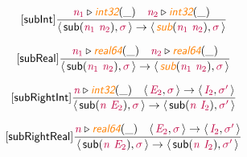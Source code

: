 \documentclass[10pt,leqno,fleqn]{article}
\newcommand{\artVariable}[1]{\mbox{\color{purple}\em #1\/}}
\newcommand{\artConstructor}[1]{\mbox{\sf #1}}
\newcommand{\artSpecial}[1]{\mbox{\color{orange}\sf\em #1}}
\begin{document}
\begin{equation}
\tag*{[\artConstructor{\sf subInt}]}
\begin{split}\frac{ \artVariable{n$_{1}$}\triangleright \artSpecial{int32}(\_) \quad  \artVariable{n$_{2}$}\triangleright \artSpecial{int32}(\_) }{\langle\, \artConstructor{\sf sub}(\artVariable{n$_{1}$}\ \artVariable{n$_{2}$}), \artVariable{$\sigma$}\,\rangle \rightarrow \langle\, \artSpecial{sub}(\artVariable{n$_{1}$}\ \artVariable{n$_{2}$}), \artVariable{$\sigma$}\,\rangle }
\end{split}
\end{equation}

\begin{equation}
\tag*{[\artConstructor{\sf subReal}]}
\begin{split}\frac{ \artVariable{n$_{1}$}\triangleright \artSpecial{real64}(\_) \quad  \artVariable{n$_{2}$}\triangleright \artSpecial{real64}(\_) }{\langle\, \artConstructor{\sf sub}(\artVariable{n$_{1}$}\ \artVariable{n$_{2}$}), \artVariable{$\sigma$}\,\rangle \rightarrow \langle\, \artSpecial{sub}(\artVariable{n$_{1}$}\ \artVariable{n$_{2}$}), \artVariable{$\sigma$}\,\rangle }
\end{split}
\end{equation}

\begin{equation}
\tag*{[\artConstructor{\sf subRightInt}]}
\begin{split}\frac{ \artVariable{n}\triangleright \artSpecial{int32}(\_) \quad \langle\, \artVariable{E$_{2}$}, \artVariable{$\sigma$}\,\rangle \rightarrow \langle\, \artVariable{I$_{2}$}, \artVariable{$\sigma$\/$^\prime$}\,\rangle }{\langle\, \artConstructor{\sf sub}(\artVariable{n}\ \artVariable{E$_{2}$}), \artVariable{$\sigma$}\,\rangle \rightarrow \langle\, \artConstructor{\sf sub}(\artVariable{n}\ \artVariable{I$_{2}$}), \artVariable{$\sigma$\/$^\prime$}\,\rangle }
\end{split}
\end{equation}

\begin{equation}
\tag*{[\artConstructor{\sf subRightReal}]}
\begin{split}\frac{ \artVariable{n}\triangleright \artSpecial{real64}(\_) \quad \langle\, \artVariable{E$_{2}$}, \artVariable{$\sigma$}\,\rangle \rightarrow \langle\, \artVariable{I$_{2}$}, \artVariable{$\sigma$\/$^\prime$}\,\rangle }{\langle\, \artConstructor{\sf sub}(\artVariable{n}\ \artVariable{E$_{2}$}), \artVariable{$\sigma$}\,\rangle \rightarrow \langle\, \artConstructor{\sf sub}(\artVariable{n}\ \artVariable{I$_{2}$}), \artVariable{$\sigma$\/$^\prime$}\,\rangle }
\end{split}
\end{equation}
\end{document}
